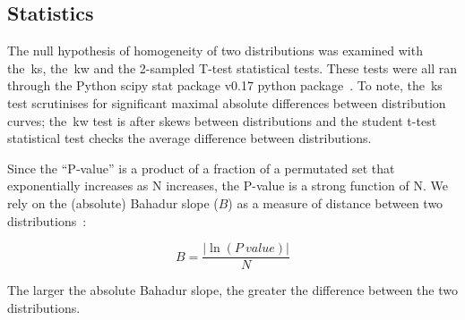 \subsection{Statistics}

The null hypothesis of homogeneity of two distributions was examined with the~\gls{ks}, the~\gls{kw} and the 2-sampled T-test statistical tests.
These tests were all ran through the Python scipy stat package v0.17 python package~\cite{VanderWalt2011}.
To note, the~\gls{ks} test scrutinises for significant maximal absolute differences between distribution curves; the~\gls{kw} test is after skews between distributions and the student t-test statistical test checks the average difference between distributions.

Since the ``P‑value'' is a product of a fraction of a permutated set that exponentially increases as N increases, the P-value is a strong function of N.
We rely on the (absolute) Bahadur slope ($B$) as a measure of distance between two distributions~\cite{Bahadur1967, Bahadur1971, Sunyaev1998, Baker2017}:

\begin{equation} \label{eq:bahadur2}
B=\frac{|\ln(P~value)|}{N}
\end{equation}

The larger the absolute Bahadur slope, the greater the difference between the two distributions.

